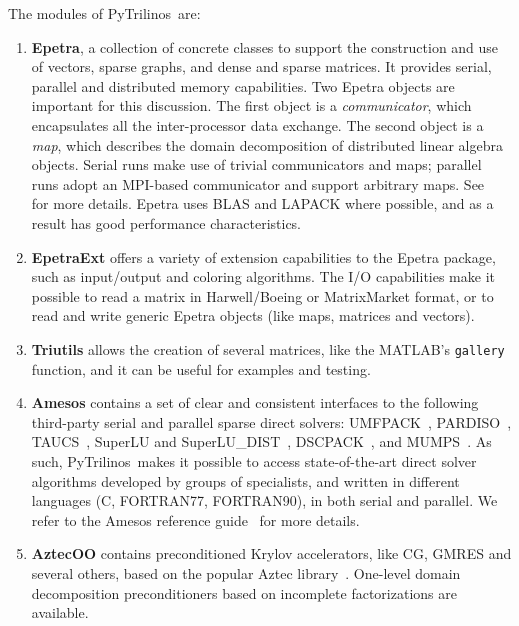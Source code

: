 \documentclass[10pt,relax]{SANDreport}
\newcommand{\PyTrilinos}{{PyTrilinos}}
\begin{document}
The modules of \PyTrilinos\ are:
\begin{enumerate}

\item {\bf Epetra}, a collection of concrete classes to support the
  construction and use of vectors, sparse graphs, and dense and sparse
  matrices. It provides serial, parallel and distributed memory
  capabilities. Two Epetra objects are important for this
  discussion. The first object is a {\sl communicator}, which
  encapsulates all the inter-processor data exchange. The second
  object is a {\sl map}, which describes the domain decomposition of
  distributed linear algebra objects. Serial runs make use of trivial
  communicators and maps; parallel runs adopt an MPI-based
  communicator and support arbitrary maps. See~\cite{epetra-guide} for
  more details.  Epetra uses BLAS and LAPACK where possible, and as a
  result has good performance characteristics.

\item {\bf EpetraExt} offers a variety of extension capabilities to
  the Epetra package, such as input/output and coloring algorithms.
  The I/O capabilities make it possible to read a matrix in
  Harwell/Boeing or MatrixMarket format, or to read and write generic
  Epetra objects (like maps, matrices and vectors).

\item {\bf Triutils} allows the creation of several matrices, like the
  MATLAB's {\tt gallery} function, and it can be useful for examples
  and testing.

\item {\bf Amesos} contains a set of clear and consistent interfaces
  to the following third-party serial and parallel sparse direct
  solvers: UMFPACK~\cite{umfpack-manual},
  PARDISO~\cite{pardiso-manual}, TAUCS~\cite{taucs-manual}, SuperLU
  and SuperLU\_DIST~\cite{superlu-manual},
  DSCPACK~\cite{dscpack-manual}, and MUMPS~\cite{mumps-manual}. As
  such, \PyTrilinos\ makes it possible to access state-of-the-art
  direct solver algorithms developed by groups of specialists, and
  written in different languages (C, FORTRAN77, FORTRAN90), in both
  serial and parallel.  We refer to the Amesos reference
  guide~\cite{Amesos-Reference-Guide} for more details.

\item {\bf AztecOO} contains preconditioned Krylov accelerators, like
  CG, GMRES and several others, based on the popular Aztec
  library~\cite{aztecoo-guide}.  One-level domain decomposition
  preconditioners based on incomplete factorizations are available.


\end{enumerate}
\end{document}
